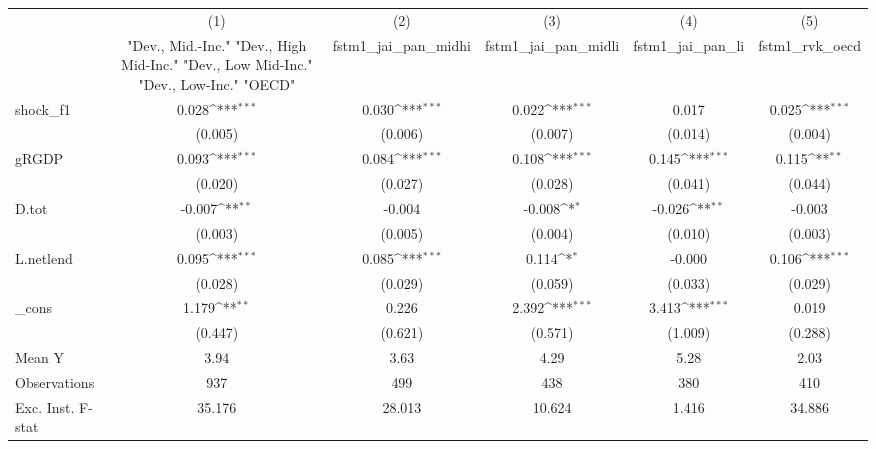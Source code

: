 {
\def\sym#1{\ifmmode^{#1}\else\(^{#1}\)\fi}
\begin{tabular}{l*{5}{c}}
\toprule
            &\multicolumn{1}{c}{(1)}&\multicolumn{1}{c}{(2)}&\multicolumn{1}{c}{(3)}&\multicolumn{1}{c}{(4)}&\multicolumn{1}{c}{(5)}\\
            &\multicolumn{1}{c}{ "Dev., Mid.-Inc." "Dev., High Mid-Inc." "Dev., Low Mid-Inc." "Dev., Low-Inc." "OECD" }&\multicolumn{1}{c}{fstm1\_jai\_pan\_midhi}&\multicolumn{1}{c}{fstm1\_jai\_pan\_midli}&\multicolumn{1}{c}{fstm1\_jai\_pan\_li}&\multicolumn{1}{c}{fstm1\_rvk\_oecd}\\
\midrule
shock\_f1    &       0.028\sym{***}&       0.030\sym{***}&       0.022\sym{***}&       0.017         &       0.025\sym{***}\\
            &     (0.005)         &     (0.006)         &     (0.007)         &     (0.014)         &     (0.004)         \\
\addlinespace
gRGDP       &       0.093\sym{***}&       0.084\sym{***}&       0.108\sym{***}&       0.145\sym{***}&       0.115\sym{**} \\
            &     (0.020)         &     (0.027)         &     (0.028)         &     (0.041)         &     (0.044)         \\
\addlinespace
D.tot       &      -0.007\sym{**} &      -0.004         &      -0.008\sym{*}  &      -0.026\sym{**} &      -0.003         \\
            &     (0.003)         &     (0.005)         &     (0.004)         &     (0.010)         &     (0.003)         \\
\addlinespace
L.netlend   &       0.095\sym{***}&       0.085\sym{***}&       0.114\sym{*}  &      -0.000         &       0.106\sym{***}\\
            &     (0.028)         &     (0.029)         &     (0.059)         &     (0.033)         &     (0.029)         \\
\addlinespace
\_cons      &       1.179\sym{**} &       0.226         &       2.392\sym{***}&       3.413\sym{***}&       0.019         \\
            &     (0.447)         &     (0.621)         &     (0.571)         &     (1.009)         &     (0.288)         \\
\midrule
Mean Y      &        3.94         &        3.63         &        4.29         &        5.28         &        2.03         \\
Observations&         937         &         499         &         438         &         380         &         410         \\
Exc. Inst. F-stat&      35.176         &      28.013         &      10.624         &       1.416         &      34.886         \\
\bottomrule
\end{tabular}
}
